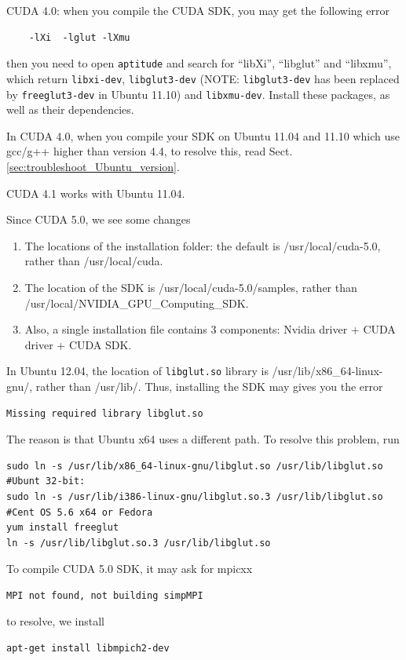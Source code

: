 CUDA 4.0: when you compile the CUDA SDK, you may get the following
error
\begin{verbatim}
    -lXi  -lglut -lXmu
\end{verbatim}
then you need to open \verb!aptitude! and search for ``libXi'', ``libglut'' and
``libxmu'', which return \verb!libxi-dev!, \verb!libglut3-dev! (NOTE:
\verb!libglut3-dev! has been replaced by \verb!freeglut3-dev! in Ubuntu 11.10)
and \verb!libxmu-dev!. Install these packages, as well as their dependencies.

In CUDA 4.0, when you compile your SDK on Ubuntu 11.04 and 11.10 which
use gcc/g++ higher than version 4.4, to resolve this, read
Sect.\ref{sec:troubleshoot_Ubuntu_version}.

CUDA 4.1 works with Ubuntu 11.04.

Since CUDA 5.0, we see some changes 
\begin{enumerate}
  \item The locations of the installation folder: the default is
  /usr/local/cuda-5.0, rather than /usr/local/cuda.
  \item The location of the SDK is /usr/local/cuda-5.0/samples, rather than
  /usr/local/NVIDIA\_GPU\_Computing\_SDK.
  \item  Also, a single installation file contains 3 components: Nvidia driver +
  CUDA driver + CUDA SDK. 
\end{enumerate}

In Ubuntu 12.04, the location of \verb!libglut.so! library is
/usr/lib/x86\_64-linux-gnu/, rather than /usr/lib/. Thus, installing the SDK may
gives you the error
\begin{verbatim}
Missing required library libglut.so
\end{verbatim}
The reason is that Ubuntu x64 uses a different path. To resolve this problem,
run

\begin{verbatim}
sudo ln -s /usr/lib/x86_64-linux-gnu/libglut.so /usr/lib/libglut.so
#Ubunt 32-bit:
sudo ln -s /usr/lib/i386-linux-gnu/libglut.so.3 /usr/lib/libglut.so
#Cent OS 5.6 x64 or Fedora
yum install freeglut
ln -s /usr/lib/libglut.so.3 /usr/lib/libglut.so
\end{verbatim}

To compile CUDA 5.0 SDK, it may ask for mpicxx
\begin{verbatim}
MPI not found, not building simpMPI
\end{verbatim}
to resolve, we install
\begin{verbatim}
apt-get install libmpich2-dev
\end{verbatim}


